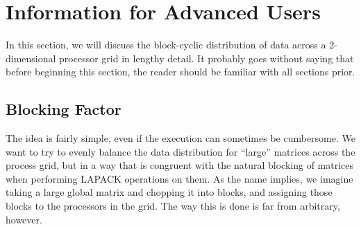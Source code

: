 \section{Information for Advanced Users}
\label{sec:advanced}

In this section, we will discuss the block-cyclic distribution of data across a 2-dimensional processor grid in lengthy detail.  It probably goes without saying that before beginning this section, the reader should be familiar with all sections prior.
 
\subsection{Blocking Factor}

The idea is fairly simple, even if the execution can sometimes be cumbersome.  We want to try to evenly balance the data distribution for ``large'' matrices across the process grid, but in a way that is congruent with the natural blocking of matrices when performing LAPACK operations on them.  As the name implies, we imagine taking a large global matrix and chopping it into blocks, and assigning those blocks to the processors in the grid.  The way this is done is far from arbitrary, however.  

